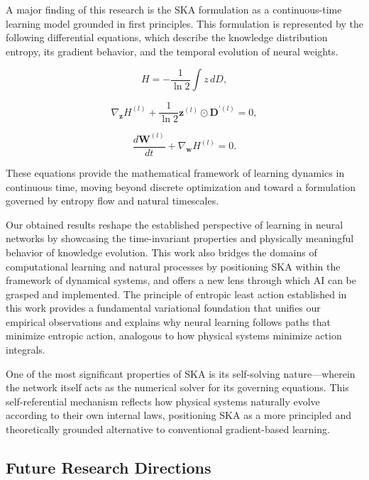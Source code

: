 \documentclass{article}
\begin{document}
A major finding of this research is the SKA formulation as a continuous-time learning model grounded in first principles. This formulation is represented by the following differential equations, which describe the knowledge distribution entropy, its gradient behavior, and the temporal evolution of neural weights.

\begin{equation}
	H = -\frac{1}{\ln 2} \int z \, dD,
\end{equation}

\begin{equation}
	\nabla_{\mathbf{z}} H^{(l)} + \frac{1}{\ln 2} \mathbf{z}^{(l)} \odot \mathbf{D}^{\prime(l)} = 0,
\end{equation}

\begin{equation}
	\frac{d\mathbf{W}^{(l)}}{dt} + \nabla_{\mathbf{w}} H^{(l)} = 0.
\end{equation}

These equations provide the mathematical framework of learning dynamics in continuous time, moving beyond discrete optimization and toward a formulation governed by entropy flow and natural timescales.

Our obtained results reshape the established perspective of learning in neural networks by showcasing the time-invariant properties and physically meaningful behavior of knowledge evolution.  This work also bridges the domains of computational learning and natural processes by positioning SKA within the framework of dynamical systems, and offers a new lens through which AI can be grasped and implemented. The principle of entropic least action established in this work provides a fundamental variational foundation that unifies our empirical observations and explains why neural learning follows paths that minimize entropic action, analogous to how physical systems minimize action integrals.

One of the most significant properties of SKA is its self-solving nature—wherein the network itself acts as the numerical solver for its governing equations. This self-referential mechanism reflects how physical systems naturally evolve according to their own internal laws, positioning SKA as a more principled and theoretically grounded alternative to conventional gradient-based learning.

\subsection{Future Research Directions}
\end{document}
